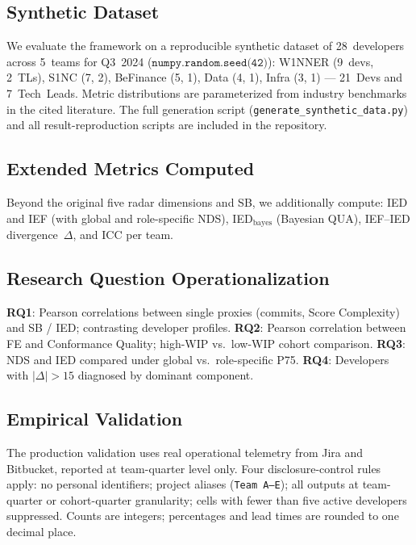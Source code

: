 \documentclass[conference]{IEEEtran}
\begin{document}
\subsection{Synthetic Dataset}

We evaluate the framework on a reproducible synthetic dataset of 28~developers
across 5~teams for Q3~2024 ($\texttt{numpy.random.seed(42)}$): W1NNER (9~devs,
2~TLs), S1NC (7, 2), BeFinance (5, 1), Data (4, 1), Infra (3, 1) --- 21~Devs
and 7~Tech~Leads. Metric distributions are parameterized from industry benchmarks
in the cited literature. The full generation script (\texttt{generate\_synthetic\_data.py})
and all result-reproduction scripts are included in the repository.

\subsection{Extended Metrics Computed}

Beyond the original five radar dimensions and SB, we additionally compute:
IED and IEF (with global and role-specific NDS), IED$_\text{bayes}$ (Bayesian
QUA), IEF--IED divergence~$\Delta$, and ICC per team.

\subsection{Research Question Operationalization}

\textbf{RQ1}: Pearson correlations between single proxies (commits, Score
Complexity) and SB / IED; contrasting developer profiles.
\textbf{RQ2}: Pearson correlation between FE and Conformance Quality;
high-WIP vs.\ low-WIP cohort comparison.
\textbf{RQ3}: NDS and IED compared under global vs.\ role-specific P75.
\textbf{RQ4}: Developers with $|\Delta| > 15$ diagnosed by dominant component.

\subsection{Empirical Validation}

The production validation uses real operational telemetry from Jira and Bitbucket,
reported at team-quarter level only. Four disclosure-control rules apply:
no personal identifiers; project aliases (\texttt{Team~A--E}); all outputs at
team-quarter or cohort-quarter granularity; cells with fewer than five active
developers suppressed. Counts are integers; percentages and lead times are rounded
to one decimal place.
\end{document}
